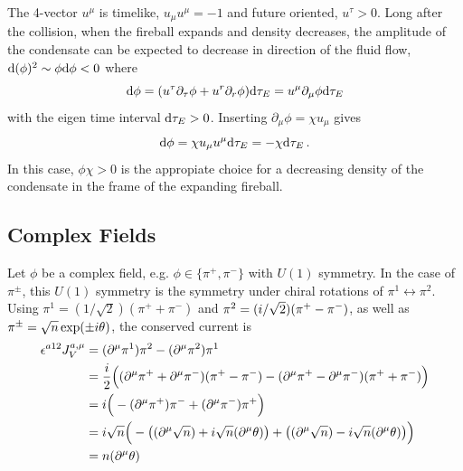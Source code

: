 The 4-vector $u^\mu$ is timelike, ${u_\mu u^\mu=-1}$ and future oriented, $u^\tau>0$. Long after the collision, when the fireball expands and density decreases, the amplitude of the condensate can be expected to decrease in direction of the fluid flow, ${\text{d}(\phi)^2\sim\phi\text{d}\phi<0}$ where
\begin{equation}
    \text{d}\phi=(u^\tau\partial_\tau\phi+u^r\partial_r\phi)\text{d}\tau_E=u^\mu\partial_\mu\phi\text{d}\tau_E
\end{equation}
with the eigen time interval $\text{d}\tau_E>0$. Inserting ${\partial_\mu\phi=\chi u_\mu}$ gives
\begin{equation}
    \text{d}\phi=\chi u_\mu u^\mu\text{d}\tau_E=-\chi\text{d}\tau_E\,.
\end{equation}
In this case, $\phi\chi>0$ is the appropiate choice for a decreasing density of the condensate in the frame of the expanding fireball.

\subsection{Complex Fields}

Let $\phi$ be a complex field, e.g. $\phi\in\{\pi^+,\pi^-\}$ with $U(1)$ symmetry. In the case of $\pi^\pm$, this $U(1)$ symmetry is the symmetry under chiral rotations of $\pi^1\leftrightarrow\pi^2$. Using $\pi^1=(1/\sqrt{2})(\pi^++\pi^-)$ and $\pi^2=({i}/\sqrt{2})(\pi^+-\pi^-)$, as well as $\pi^\pm=\sqrt{n}\exp(\pm{i}\theta)$, the conserved current is
\begin{align}
    \epsilon^{a12}J_V^{a,\mu}&=(\partial^\mu\pi^1)\pi^2-(\partial^\mu\pi^2)\pi^1\\
    &=\frac{{i}}{2}\Big((\partial^\mu\pi^++\partial^\mu\pi^-)(\pi^+-\pi^-)-(\partial^\mu\pi^+-\partial^\mu\pi^-)(\pi^++\pi^-)\Big)\\
    &={i}\Big(-(\partial^\mu\pi^+)\pi^-+(\partial^\mu\pi^-)\pi^+\Big)\\
    &={i}\sqrt{n}\Big(-\big((\partial^\mu\sqrt{n})+{i}\sqrt{n}(\partial^\mu\theta)\big)+\big((\partial^\mu\sqrt{n})-{i}\sqrt{n}(\partial^\mu\theta)\big)\Big)\\
    &=n(\partial^\mu\theta)
\end{align}

